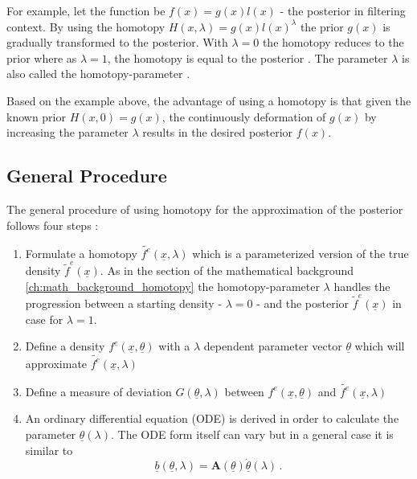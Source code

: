\documentclass[a4paper]{IEEEtran}
\begin{document}
For example, let the function be $f(x)=g(x)l(x)$ - the posterior in filtering context. By using the homotopy $H(x, \lambda) = g(x)l(x)^{\lambda}$ the prior
$g(x)$ is gradually transformed to the posterior. With $\lambda = 0$ the homotopy reduces to the prior where as $\lambda = 1$, the homotopy is equal to the posterior \cite{daum2007}. The parameter $\lambda$ is also called the homotopy-parameter \cite{liao2012}.

Based on the example above, the advantage of using a homotopy is that given the known prior $H(x,0)=g(x)$, the continuously deformation of $g(x)$ by increasing the parameter $\lambda$ 
results in the desired posterior $f(x)$. 

\subsection{General Procedure}
\label{ch:general_idea_homotopy}
The general procedure of using homotopy for the approximation of the posterior follows four steps \cite{hanebeck2003}:
\begin{enumerate}
    \item Formulate a homotopy $\tilde{f^e}(\underline{x},\lambda)$ which is a parameterized version of the true density $\tilde{f}^{e}(\underline{x})$. As in the section of the mathematical background \ref{ch:math_background_homotopy}
    the homotopy-parameter $\lambda$ handles the progression between a starting density - $\lambda = 0$ - and the posterior $\tilde{f}^e(\underline{x})$ in case for $\lambda = 1$.
    \item Define a density $f^e(\underline{x}, \underline{\theta})$ with a $\lambda$ dependent parameter vector $\underline{\theta}$ which will approximate $\tilde{f^e}(\underline{x},\lambda)$
    \item Define a measure of deviation $G(\underline{\theta}, \lambda)$ between $f^e(\underline{x}, \underline{\theta})$ and $\tilde{f^e}(\underline{x},\lambda)$
    \item An ordinary differential equation (ODE) is derived in order to calculate the parameter $\underline{\theta}(\lambda)$. The ODE form itself can vary but in a general case it is similar to
    \begin{equation}
        \underline{b}(\underline{\theta}, \lambda) = \textbf{A}(\underline{\theta})\underline{\dot{\theta}}(\lambda) \,.
        \label{eq:ode_general}
    \end{equation}
\end{enumerate}
\end{document}
